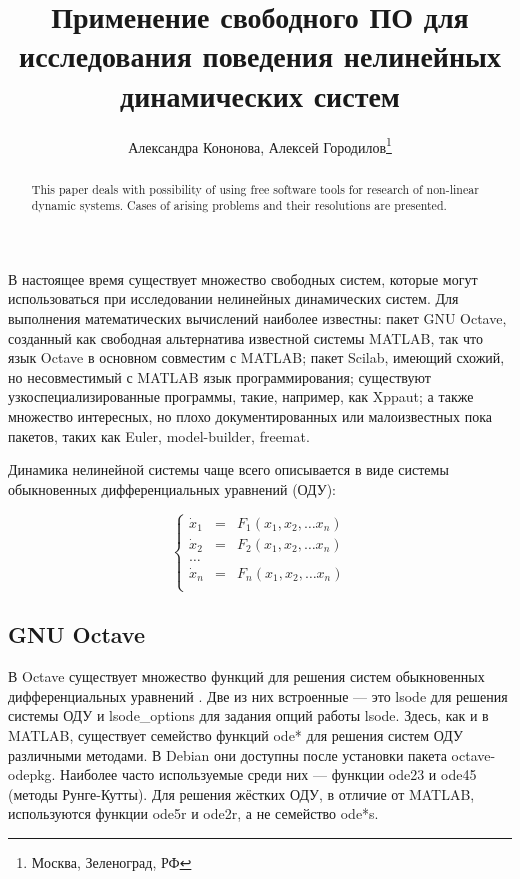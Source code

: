 \documentclass[10pt, a5paper]{article}
\begin{document}
\title{Применение свободного ПО для исследования поведения нелинейных динамических систем}%

\author{Александра Кононова, Алексей Городилов\footnote{Москва, Зеленоград, РФ}}
\maketitle

\begin{abstract}
This paper deals with possibility of using free software tools for research of non-linear dynamic systems. Cases of arising problems and their resolutions are presented. 
\end{abstract}

В настоящее время существует множество свободных систем, которые могут использоваться при исследовании нелинейных динамических систем. Для выполнения математических вычислений наиболее известны: пакет GNU Octave, созданный как свободная альтернатива известной системы MATLAB, так что язык Octave в основном совместим с MATLAB; пакет Scilab, имеющий схожий, но несовместимый с MATLAB язык программирования; существуют узкоспециализированные программы, такие, например, как Xppaut; а также множество интересных, но плохо документированных или малоизвестных пока пакетов, таких как Euler, model-builder, freemat.

Динамика нелинейной системы чаще всего описывается в виде системы обыкновенных дифференциальных уравнений (ОДУ):

$$
\left\{ 
\begin{array}{lll}
\dot x_1 &=& F_1(x_1, x_2,   \ldots  x_n )  \\
\dot x_2 &=& F_2(x_1, x_2,   \ldots  x_n )  \\
\ldots \\
\dot x_n &=& F_n(x_1, x_2,  \ldots  x_n )  \\
\end{array}
\right.
$$

\subsection*{GNU Octave}

В Octave существует множество функций для решения систем обыкновенных дифференциальных уравнений \cite{Kon1}. Две из них встроенные --- это lsode для решения системы ОДУ и lsode\_options для задания опций работы lsode. Здесь, как и в MATLAB, существует семейство функций ode* для решения систем ОДУ различными методами. В Debian они доступны после установки пакета octave-odepkg. Наиболее часто используемые среди них --- функции ode23 и ode45 (методы Рунге-Кутты). Для решения жёстких ОДУ, в отличие от MATLAB, используются функции ode5r и ode2r, а не семейство ode*s.
\end{document}
